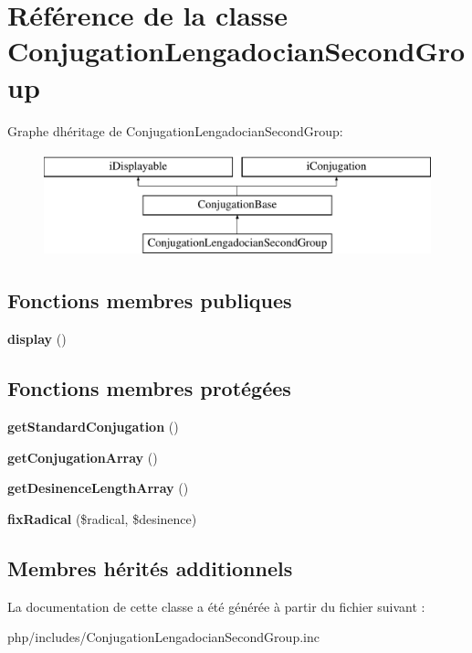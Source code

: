 \hypertarget{classConjugationLengadocianSecondGroup}{}\section{Référence de la classe Conjugation\+Lengadocian\+Second\+Group}
\label{classConjugationLengadocianSecondGroup}
Graphe d\textquotesingle{}héritage de Conjugation\+Lengadocian\+Second\+Group\+:\begin{figure}[H]
\begin{center}
\leavevmode
\includegraphics[height=3.000000cm]{classConjugationLengadocianSecondGroup}
\end{center}
\end{figure}
\subsection*{Fonctions membres publiques}
\begin{DoxyCompactItemize}
\item 
\hypertarget{classConjugationLengadocianSecondGroup_a9d00d6ae2616d21e1cf495ec94c06aa9}{}\label{classConjugationLengadocianSecondGroup_a9d00d6ae2616d21e1cf495ec94c06aa9} 
{\bfseries display} ()
\end{DoxyCompactItemize}
\subsection*{Fonctions membres protégées}
\begin{DoxyCompactItemize}
\item 
\hypertarget{classConjugationLengadocianSecondGroup_a710cb66b717733d6d5198e23a261bdab}{}\label{classConjugationLengadocianSecondGroup_a710cb66b717733d6d5198e23a261bdab} 
{\bfseries get\+Standard\+Conjugation} ()
\item 
\hypertarget{classConjugationLengadocianSecondGroup_a06cea5291eea31ff2aa699f5c27cbf5f}{}\label{classConjugationLengadocianSecondGroup_a06cea5291eea31ff2aa699f5c27cbf5f} 
{\bfseries get\+Conjugation\+Array} ()
\item 
\hypertarget{classConjugationLengadocianSecondGroup_a8230cbb2d79d7ce6d85b866082925b12}{}\label{classConjugationLengadocianSecondGroup_a8230cbb2d79d7ce6d85b866082925b12} 
{\bfseries get\+Desinence\+Length\+Array} ()
\item 
\hypertarget{classConjugationLengadocianSecondGroup_a236aaf5140e4cb5738a2af876eded810}{}\label{classConjugationLengadocianSecondGroup_a236aaf5140e4cb5738a2af876eded810} 
{\bfseries fix\+Radical} (\$radical, \$desinence)
\end{DoxyCompactItemize}
\subsection*{Membres hérités additionnels}


La documentation de cette classe a été générée à partir du fichier suivant \+:\begin{DoxyCompactItemize}
\item 
php/includes/Conjugation\+Lengadocian\+Second\+Group.\+inc\end{DoxyCompactItemize}
